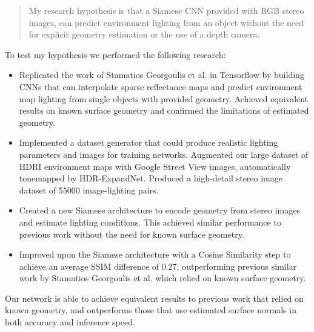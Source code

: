 \documentclass[ %
                    author={Gavin Parker},
                supervisor={Dr. Neill Campbell},
                    degree={MEng},
                     title={Deep Siamese Networks for Illumination Estimation from Stereo Images},
                  subtitle={},
                      type={Research},
                      year={2018} ]{dissertation}
\begin{document}
\begin{quote}
My research hypothesis is that a Siamese CNN provided with RGB stereo images, can predict environment lighting from an object without the need for explicit geometry estimation or the use of a depth camera.
\end{quote}

To test my hypothesis we performed the following research:

\noindent
\begin{itemize}
\item Replicated the work of Stamatios Georgoulis et al.\cite{Georgoulis_2017_ICCV} in Tensorflow by building CNNs that can interpolate sparse reflectance maps and predict environment map lighting from single objects with provided geometry. Achieved equivalent results on known surface geometry and confirmed the limitations of estimated geometry.
\item Implemented a dataset generator that could produce realistic lighting parameters and images for training networks. Augmented our large dataset of HDRI environment maps with Google Street View images, automatically tonemapped by HDR-ExpandNet. Produced a high-detail stereo image dataset of 55000 image-lighting pairs.
\item Created a new Siamese architecture to encode geometry from stereo images and estimate lighting conditions. This achieved similar performance to previous work without the need for known surface geometry.
\item Improved upon the Siamese architecture with a Cosine Similarity step to achieve an average SSIM difference of 0.27, outperforming previous similar work by Stamatios Georgoulis et al. \cite{Georgoulis_2017_ICCV} which relied on known surface geometry.
\end{itemize}

Our network is able to achieve equivalent results to previous work that relied on known geometry, and outperforms those that use estimated surface normals in both accuracy and inference speed.


\tableofcontents

\end{document}
